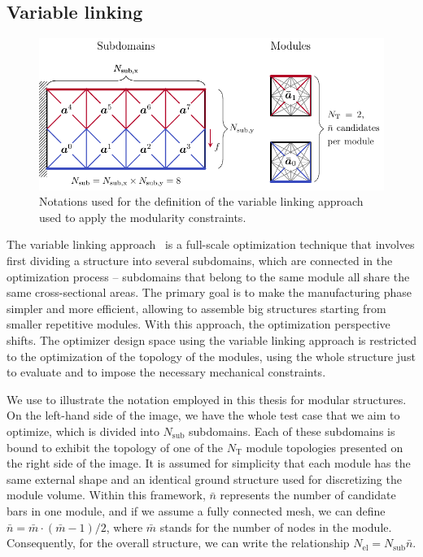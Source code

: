 \subsection{Variable linking}
\begin{figure}
    \centering
    \includegraphics{figures/05_cellular_opt/00_modules_VL_bc/modules_bc.pdf}
    \caption{Notations used for the definition of the variable linking approach used to apply the modularity constraints.}
    \label{fig:05_VL}
\end{figure}

The variable linking approach~ is a full-scale optimization technique that involves first dividing a structure into several subdomains, which are connected in the optimization process -- \ie subdomains that belong to the same module all share the same cross-sectional areas. The primary goal is to make the manufacturing phase simpler and more efficient, allowing to assemble big structures starting from smaller repetitive modules. With this approach, the optimization perspective shifts. The optimizer design space using the variable linking approach is restricted to the optimization of the topology of the modules, using the whole structure just to evaluate and to impose the necessary mechanical constraints.

We use  to illustrate the notation employed in this thesis for modular structures. On the left-hand side of the image, we have the whole test case that we aim to optimize, which is divided into $N_\text{sub}$ subdomains. Each of these subdomains is bound to exhibit the topology of one of the $N_\text{T}$ module topologies presented on the right side of the image. It is assumed for simplicity that each module has the same external shape and an identical ground structure used for discretizing the module volume. Within this framework, $\bar{n}$ represents the number of candidate bars in one module, and if we assume a fully connected mesh, we can define $\bar{n} = \bar{m} \cdot (\bar{m}-1)/2$, where $\bar{m}$ stands for the number of nodes in the module. Consequently, for the overall structure, we can write the relationship $N_{\text{el}} = N_{\text{sub}}\bar{n}$.


